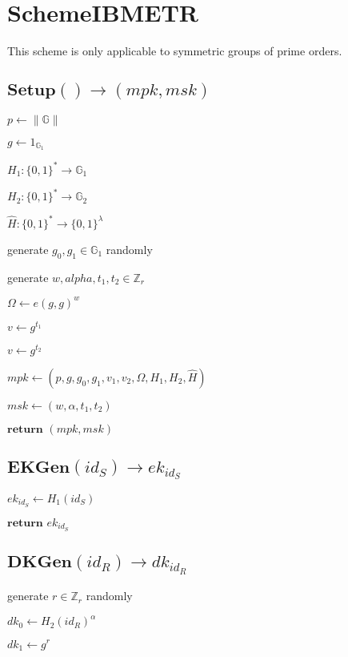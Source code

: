 \documentclass[a4paper]{article}
\begin{document}
\section{SchemeIBMETR}

This scheme is only applicable to symmetric groups of prime orders. 

\subsection{$\textbf{Setup}() \rightarrow (\textit{mpk}, \textit{msk})$}

$p \gets \|\mathbb{G}\|$

$g \gets 1_{\mathbb{G}_1}$

$H_1:\{0, 1\}^* \rightarrow \mathbb{G}_1$

$H_2:\{0, 1\}^* \rightarrow \mathbb{G}_2$

$\hat{H}: \{0, 1\}^* \rightarrow \{0, 1\}^\lambda$

generate $g_0, g_1 \in \mathbb{G}_1$ randomly

generate $w, alpha, t_1, t_2 \in \mathbb{Z}_r$

$\Omega \gets e(g, g)^w$

$v \gets g^{t_1}$

$v \gets g^{t_2}$

$\textit{mpk} \gets (p, g, g_0, g_1, v_1, v_2, \Omega, H_1, H_2, \hat{H})$

$\textit{msk} \gets (w, \alpha, t_1, t_2)$

$\textbf{return }(\textit{mpk}, \textit{msk})$

\subsection{$\textbf{EKGen}(\textit{id}_S) \rightarrow \textit{ek}_{\textit{id}_S}$}

$\textit{ek}_{\textit{id}_S} \gets H_1(\textit{id}_S)$

$\textbf{return }\textit{ek}_{\textit{id}_S}$

\subsection{$\textbf{DKGen}(\textit{id}_R) \rightarrow \textit{dk}_{\textit{id}_R}$}

generate $r \in \mathbb{Z}_r$ randomly

$\textit{dk}_0 \gets H_2(\textit{id}_R)^\alpha$

$\textit{dk}_1 \gets g^r$
\end{document}
